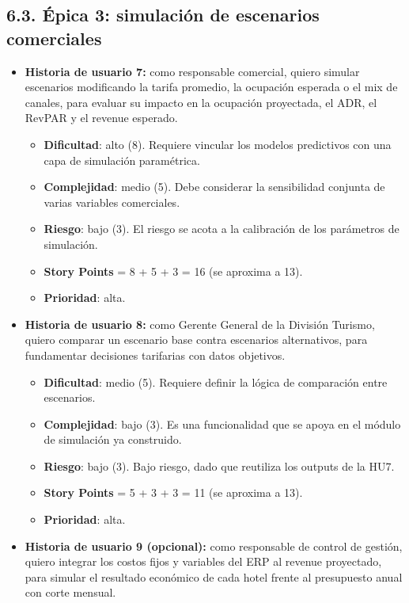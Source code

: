 \documentclass[
11pt, %
]{charter}
\begin{document}
\subsection*{6.3. Épica 3: simulación de escenarios comerciales}
\begin{itemize}
  \item \textbf{Historia de usuario 7:} como responsable comercial, quiero simular escenarios modificando la tarifa promedio, la ocupación esperada o el mix de canales, para evaluar su impacto en la ocupación proyectada, el ADR, el RevPAR y el revenue esperado.
    \begin{itemize}
      \item \textbf{Dificultad}: alto (8). Requiere vincular los modelos predictivos con una capa de simulación paramétrica.
      \item \textbf{Complejidad}: medio (5). Debe considerar la sensibilidad conjunta de varias variables comerciales.
      \item \textbf{Riesgo}: bajo (3). El riesgo se acota a la calibración de los parámetros de simulación.
      \item \textbf{Story Points} = 8 + 5 + 3 = 16 (se aproxima a 13).
      \item \textbf{Prioridad}: alta.
    \end{itemize}
  \item \textbf{Historia de usuario 8:} como Gerente General de la División Turismo, quiero comparar un escenario base contra escenarios alternativos, para fundamentar decisiones tarifarias con datos objetivos.
    \begin{itemize}
      \item \textbf{Dificultad}: medio (5). Requiere definir la lógica de comparación entre escenarios.
      \item \textbf{Complejidad}: bajo (3). Es una funcionalidad que se apoya en el módulo de simulación ya construido.
      \item \textbf{Riesgo}: bajo (3). Bajo riesgo, dado que reutiliza los outputs de la HU7.
      \item \textbf{Story Points} = 5 + 3 + 3 = 11 (se aproxima a 13).
      \item \textbf{Prioridad}: alta.
    \end{itemize}
  \item \textbf{Historia de usuario 9 (opcional):} como responsable de control de gestión, quiero integrar los costos fijos y variables del ERP al revenue proyectado, para simular el resultado económico de cada hotel frente al presupuesto anual con corte mensual.

\end{itemize}
\end{document}
